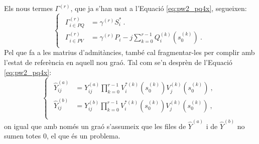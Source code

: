 Els nous termes $\Gamma^{(r)}$, que ja s'han usat a l'Equació \ref{eq:pw2_pq4x}, segueixen:
\begin{equation}
    \begin{cases}
    \begin{split}
        \Gamma^{(r)}_{i\in PQ}&=\gamma^{(r)}S^*_i\ .\\
        \Gamma^{(r)}_{i\in PV}&=\gamma^{(r)}P_i-j\sum_{k=0}^{r-1}Q^{(k)}_i(s^{(k)}_0)\ .
    \end{split}
\end{cases}
    \label{eq:Gammar1}
\end{equation}
Pel que fa a les matrius d'admitàncies, també cal fragmentar-les per complir amb l'estat de referència en aquell nou graó. Tal com se'n desprèn de l'Equació \ref{eq:pw2_pq4x}:
\begin{equation}
    \begin{cases}
    \begin{split}
        \widehat{Y}^{(a)}_{ij} &= Y^{(a)}_{ij}\prod_{k=0}^{r-1}V^{*{(k)}}_i(s^{(k)}_0)V^{{(k)}}_j(s^{(k)}_0)\ ,\\
        \widehat{Y}^{(b)}_{ij} &= Y^{(b)}_{ij}\prod_{k=0}^{r-1}V^{*{(k)}}_i(s^{(k)}_0)V^{{(k)}}_j(s^{(k)}_0)\ ,\\
    \end{split}
\end{cases}
    \label{eq:sy1r}
\end{equation}
on igual que amb només un graó s'assumeix que les files de $\widehat{Y}^{(a)}$ i de $\widehat{Y}^{(b)}$ no sumen totes 0, el que és un problema. 

